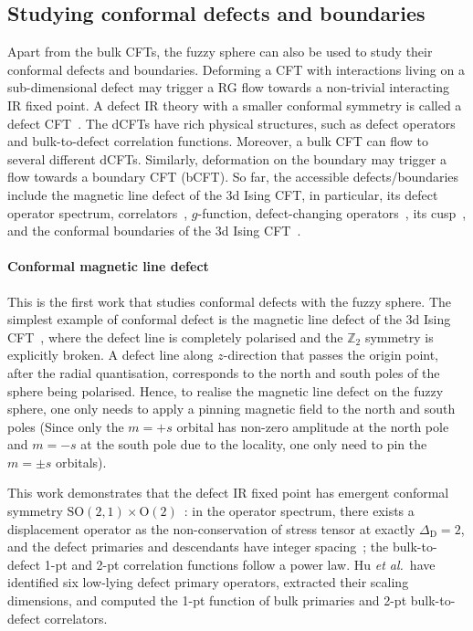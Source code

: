 \documentclass{timesjhep}
\begin{document}
\subsection{Studying conformal defects and boundaries}

Apart from the bulk CFTs, the fuzzy sphere can also be used to study their conformal defects and boundaries. Deforming a CFT with interactions living on a sub-dimensional defect may trigger a RG flow towards a non-trivial interacting IR fixed point. A defect IR theory with a smaller conformal symmetry is called a defect CFT~\cite{Billo2013Defect,Billo2016Defect}. The dCFTs have rich physical structures, such as defect operators and bulk-to-defect correlation functions. Moreover, a bulk CFT can flow to several different dCFTs. Similarly, deformation on the boundary may trigger a flow towards a boundary CFT (bCFT). So far, the accessible defects/boundaries include the magnetic line defect of the 3d Ising CFT, in particular, its defect operator spectrum, correlators~\cite{Hu2023Aug}, $g$-function, defect-changing operators~\cite{Zhou2024Jan}, its cusp~\cite{Cuomo2024}, and the conformal boundaries of the 3d Ising CFT~\cite{Zhou2024Jul,Dedushenko2024}.

\paragraph{Conformal magnetic line defect~\cite{Hu2023Aug}}

This is the first work that studies conformal defects with the fuzzy sphere. The simplest example of conformal defect is the magnetic line defect of the 3d Ising CFT~\cite{Andreas2000MagLine,Allais2014MagLine,Allais2013MagLine,Pannell2023MagLine}, where the defect line is completely polarised and the $\mathbb{Z}_2$ symmetry is explicitly broken. A defect line along $z$-direction that passes the origin point, after the radial quantisation, corresponds to the north and south poles of the sphere being polarised. Hence, to realise the magnetic line defect on the fuzzy sphere, one only needs to apply a pinning magnetic field to the north and south poles (Since only the $m=+s$ orbital has non-zero amplitude at the north pole and $m=-s$ at the south pole due to the locality, one only need to pin the $m=\pm s$ orbitals).

This work demonstrates that the defect IR fixed point has emergent conformal symmetry $\mathrm{SO}(2,1)\times\mathrm{O}(2)$~: in the operator spectrum, there exists a displacement operator as the non-conservation of stress tensor at exactly $\Delta_\mathrm{D}=2$, and the defect primaries and descendants have integer spacing~; the bulk-to-defect 1-pt and 2-pt correlation functions follow a power law. Hu \textit{et al.}~have identified six low-lying defect primary operators, extracted their scaling dimensions, and computed the 1-pt function of bulk primaries and 2-pt bulk-to-defect correlators.
\end{document}
